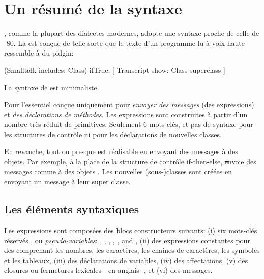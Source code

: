 \documentclass[a4paper,10pt,twoside]{book}
\begin{document}
	\renewcommand{\nnbb}[2]{} %
	\sloppy
\fi
\chapter{Un r\'esum\'e de la syntaxe}
\label{cha:syntax}



\sq, comme la plupart des dialectes modernes, \st adopte une syntaxe proche de celle de \st-80.
La  est con\c{c}ue de telle sorte que le texte d'un programme lu \`{a} voix haute ressemble \`{a} du pidgin:

\begin{code}{}
(Smalltalk includes: Class) ifTrue: [ Transcript show: Class superclass ]
\end{code}

\noindent
La syntaxe de \sq est minimaliste.

Pour l'essentiel con\c{c}ue uniquement pour \emph{envoyer des messages} (\ie des expressions) et  \emph{des d\'{e}clarations de m\'{e}thodes}.
Les expressions sont construites \`{a} partir d'un nombre tr\`{e}s r\'{e}duit de primitives.
Seulement 6 mots cl\'{e}s, et pas de syntaxe pour les structures de contr\^{o}le ni pour les d\'{e}clarations de nouvelles classes.

En revanche, tout ou presque est r\'{e}alisable en envoyant des messages \`{a} des objets.
Par exemple, \`{a} la place de la structure de contr\^{o}le if-then-else, \st envoie des messages comme  \`{a} des objets  .
Les nouvelles \mbox{(sous-)classes} sont cr\'{e}\'{e}es en envoyant un message \`{a} leur super classe.

\section{Les \'{e}l\'{e}ments syntaxiques }

Les expressions sont compos\'{e}es des blocs constructeurs suivants:
(i) six mots-cl\'{e}s r\'{e}serv\'{e}s , ou \emph{pseudo-variables}:
, , , , , and ,
(ii) des expressions constantes pour des  comprenant les nombres, les caract\`{e}res, les chaines de caract\`{e}res, les symboles et les tableaux,
(iii) des d\'{e}clarations de variables,
(iv) des affectations,
(v) des closures ou fermetures lexicales -  en anglais -, et
(vi) des messages.
\end{document}
